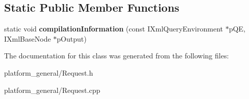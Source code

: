 \subsection*{\-Static \-Public \-Member \-Functions}
\begin{DoxyCompactItemize}
\item 
\hypertarget{classgeneral__server_1_1Request_a1706fb328aba10c2cd00445aa627ee6b}{static void {\bfseries compilation\-Information} (const \-I\-Xml\-Query\-Environment $\ast$p\-Q\-E, \-I\-Xml\-Base\-Node $\ast$p\-Output)}\label{classgeneral__server_1_1Request_a1706fb328aba10c2cd00445aa627ee6b}

\end{DoxyCompactItemize}


\-The documentation for this class was generated from the following files\-:\begin{DoxyCompactItemize}
\item 
platform\-\_\-general/\-Request.\-h\item 
platform\-\_\-general/\-Request.\-cpp\end{DoxyCompactItemize}
